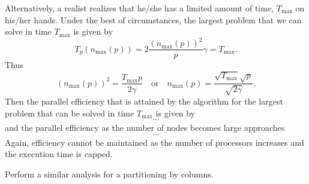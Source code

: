Alternatively, a realist realizes that he/she has a limited amount of time,
$ T_{\mbox{max}} $ on
his/her hands.  Under the best of circumstances, the largest problem
that we can solve in time $ T_{\mbox{max}} $ is given by
\[ 
T_p(n_{\mbox{max}}(p)) = 2 \frac{(n_{\mbox{max}}(p))^2}{p} \gamma = T_{\mbox{max}} .
\]
Thus
\[
(n_{\mbox{max}}(p))^2 = \frac{T_{\mbox{max}} p}{2 \gamma}
\quad
\mbox{or}
\quad
n_{\mbox{max}}(p) = \frac{\sqrt{T_{\mbox{max}}} \sqrt{p}}{\sqrt{2 \gamma}}.
\]
Then the parallel efficiency that is attained by the algorithm for the largest
problem that can be solved in time $ T_{\mbox{max}} $ is given by
\[
~
\cdots
~\]
and the parallel efficiency as the number of nodes becomes large approaches
\[
~
\cdots
~
\]
Again, efficiency cannot be maintained as the number of processors increases and the execution time is capped.

\begin{exercise}
  Perform a similar analysis for a partitioning by columns.
\end{exercise}
